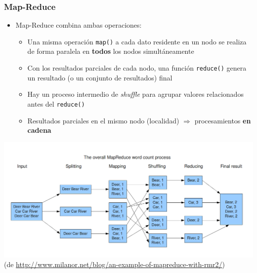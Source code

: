 \documentclass[14pt]{beamer}
\begin{document}
\begin{frame}
\frametitle{Map-Reduce}



\begin{itemize}

\item Map-Reduce combina ambas operaciones:
\begin{itemize}
\item Una misma operación {\tt map()} a cada dato residente en un nodo se
  realiza de forma paralela en {\bf todos} los nodos simultáneamente
\item Con los resultados parciales de cada nodo, una función {\tt reduce()}
  genera un resultado (o un conjunto de resultados) final
\item Hay un proceso intermedio de {\em shuffle} para agrupar valores
  relacionados antes del {\tt reduce()}
\item Resultados parciales en el mismo nodo (localidad) $\Rightarrow$
  procesamientos {\bf en cadena}
\end{itemize}
\end{itemize}


\framebreak

\centering\includegraphics[width=\textwidth]{img/MapReduceWordcount}
(de \url{http://www.milanor.net/blog/an-example-of-mapreduce-with-rmr2/})
\end{frame}
\end{document}
